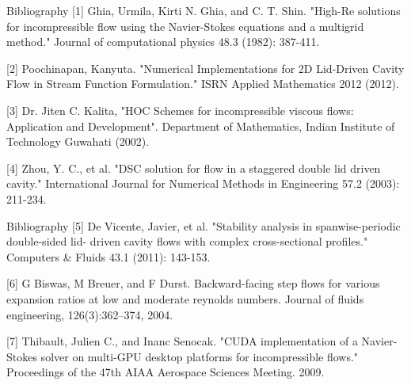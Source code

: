 \documentclass[11pt]{beamer}
\begin{document}
\begin{frame}{Bibliography}
[1]	Ghia, Urmila, Kirti N. Ghia, and C. T. Shin. "High-Re solutions for incompressible flow 	using the Navier-Stokes equations and a multigrid method." Journal of 	computational physics 48.3 (1982): 387-411.\linebreak

[2]	Poochinapan, Kanyuta. "Numerical Implementations for 2D Lid-Driven Cavity Flow in 	Stream Function Formulation." ISRN Applied Mathematics 2012 (2012).\linebreak

[3]	Dr. Jiten C. Kalita, "HOC Schemes for incompressible viscous flows: Application and 	Development". Department of Mathematics, Indian Institute of Technology Guwahati (2002).\linebreak

[4]	Zhou, Y. C., et al. "DSC solution for flow in a staggered double lid driven cavity." 	International Journal for Numerical Methods in Engineering 57.2 (2003): 211-234.
\end{frame}
\begin{frame}{Bibliography}
[5]	De Vicente, Javier, et al. "Stability analysis in spanwise-periodic double-sided lid-	driven cavity flows with complex cross-sectional profiles." Computers \& Fluids 43.1 	(2011): 143-153.\linebreak

[6] G Biswas, M Breuer, and F Durst. Backward-facing step flows for various expansion ratios at low and moderate reynolds numbers. Journal of fluids engineering, 126(3):362–374, 2004.\linebreak

[7] Thibault, Julien C., and Inanc Senocak. "CUDA implementation of a Navier-Stokes solver on multi-GPU desktop platforms for incompressible flows." Proceedings of the 47th AIAA Aerospace Sciences Meeting. 2009.
\end{frame}
\end{document}
